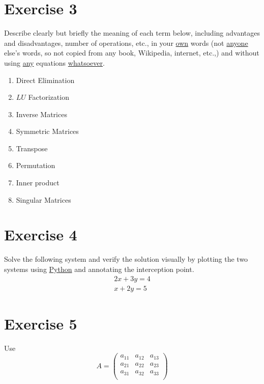 \documentclass[12pt]{article}
\begin{document}
\section{Exercise 3}
Describe clearly but briefly the meaning of each term below, including
advantages and disadvantages, number of operations, etc.,  in your
\underline{own} words (not \underline{anyone} else's words, so not copied
from any book, Wikipedia, internet, etc.,) and without using
\underline{any} equations \underline{whatsoever}.

\begin{enumerate}[label=(\alph*)]
    \item Direct Elimination 
    \item $LU$ Factorization
    \item Inverse Matrices 
    \item Symmetric Matrices  
    \item Transpose
    \item Permutation 
    \item Inner product
    \item Singular Matrices
\end{enumerate}

\section{Exercise 4}
Solve the following system  and verify the solution visually by plotting
the two systems using \underline{Python} and annotating the interception
point. 
\begin{equation}
    \begin{aligned}
        2x  + 3y    = 4 \\
        x   + 2y    = 5 
    \end{aligned}
\end{equation}
\newpage
\section{Exercise 5}
Use
\begin{equation}
    A   = 
    \begin{pmatrix}
        a_{11}  &   a_{12}  &   a_{13}  \\
        a_{21}  &   a_{22}  &   a_{23}  \\
        a_{31}  &   a_{32}  &   a_{33}  \\
    \end{pmatrix}
\end{equation}
\end{document}
